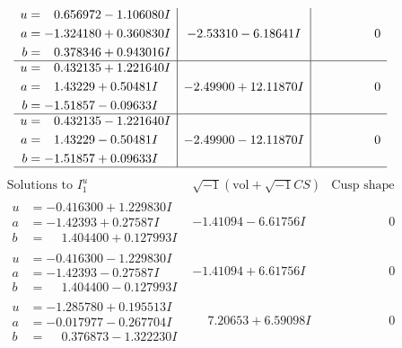 \documentclass[1p]{elsarticle_modified}
\theoremstyle{definition}
\newcommand{\I}{\sqrt{-1}}
\begin{document}
$$\begin{array}{c|c|c}
\begin{aligned}
u &= \phantom{-}0.656972 - 1.106080 I \\
a &= -1.324180 + 0.360830 I \\
b &= \phantom{-}0.378346 + 0.943016 I\end{aligned}
 & -2.53310 - 6.18641 I & \phantom{-0.000000 } 0 \\ \hline\begin{aligned}
u &= \phantom{-}0.432135 + 1.221640 I \\
a &= \phantom{-}1.43229 + 0.50481 I \\
b &= -1.51857 - 0.09633 I\end{aligned}
 & -2.49900 + 12.11870 I & \phantom{-0.000000 } 0 \\ \hline\begin{aligned}
u &= \phantom{-}0.432135 - 1.221640 I \\
a &= \phantom{-}1.43229 - 0.50481 I \\
b &= -1.51857 + 0.09633 I\end{aligned}
 & -2.49900 - 12.11870 I & \phantom{-0.000000 } 0\\
 \hline 
 \end{array}$$\newpage$$\begin{array}{c|c|c}  
\text{Solutions to }I^u_{1}& \I (\text{vol} + \sqrt{-1}CS) & \text{Cusp shape}\\
 \hline 
\begin{aligned}
u &= -0.416300 + 1.229830 I \\
a &= -1.42393 + 0.27587 I \\
b &= \phantom{-}1.404400 + 0.127993 I\end{aligned}
 & -1.41094 - 6.61756 I & \phantom{-0.000000 } 0 \\ \hline\begin{aligned}
u &= -0.416300 - 1.229830 I \\
a &= -1.42393 - 0.27587 I \\
b &= \phantom{-}1.404400 - 0.127993 I\end{aligned}
 & -1.41094 + 6.61756 I & \phantom{-0.000000 } 0 \\ \hline\begin{aligned}
u &= -1.285780 + 0.195513 I \\
a &= -0.017977 - 0.267704 I \\
b &= \phantom{-}0.376873 - 1.322230 I\end{aligned}
 & \phantom{-}7.20653 + 6.59098 I & \phantom{-0.000000 } 0 \\ \hline\begin{aligned}

\end{aligned}
\end{array}$$
\end{document}
